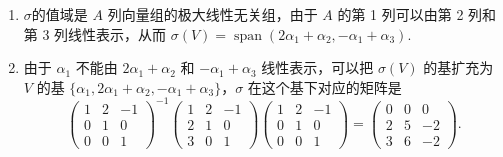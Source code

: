 \documentclass[UTF8,12pt,a4paper,fontset=fandol]{ctexart}
\begin{document}
\begin{solve}
\begin{enumerate}
        \item  $\sigma$的值域是 $A$ 列向量组的极大线性无关组，由于 $ A $ 的第 1 列可以由第 2 列和第 3 列线性表示，从而 $\sigma(V)=\operatorname{span}(2 \alpha_{1}+\alpha_{2}, -\alpha_{1}+\alpha_{3})$.

        \item 由于 $\alpha_{1}$ 不能由 $2 \alpha_{1}+\alpha_{2}$ 和 $-\alpha_{1}+\alpha_{3}$ 线性表示，可以把 $\sigma(V)$ 的基扩充为 $V$ 的基 $\{\alpha_{1}, 2 \alpha_{1}+\alpha_{2}, -\alpha_{1}+\alpha_{3}\}$，$\sigma$ 在这个基下对应的矩阵是
              \[\begin{pmatrix}
                      1 & 2 & -1 \\
                      0 & 1 & 0  \\
                      0 & 0 & 1
                  \end{pmatrix}^{-1}\begin{pmatrix}
                      1 & 2 & -1 \\
                      2 & 1 & 0  \\
                      3 & 0 & 1
                  \end{pmatrix}\begin{pmatrix}
                      1 & 2 & -1 \\
                      0 & 1 & 0  \\
                      0 & 0 & 1
                  \end{pmatrix}=\begin{pmatrix}
                      0 & 0 & 0  \\
                      2 & 5 & -2 \\
                      3 & 6 & -2
                  \end{pmatrix}.\]


\end{enumerate}
\end{solve}
\end{document}
